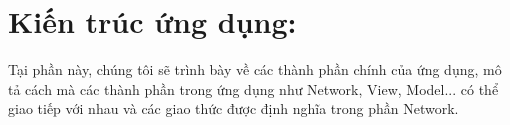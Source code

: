 \section{Kiến trúc ứng dụng: }
Tại phần này, chúng tôi sẽ trình bày về các thành phần chính của ứng dụng, mô tả cách mà các thành phần trong ứng dụng như Network, View, Model... có thể giao tiếp với nhau và các giao thức được định nghĩa trong phần Network.


